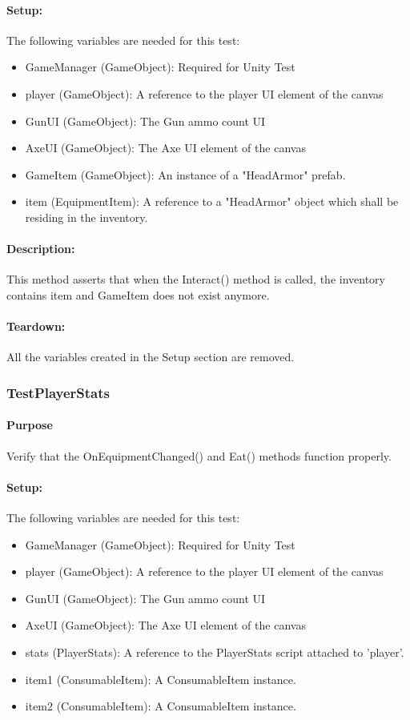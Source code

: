 \documentclass[12pt, titlepage]{article}
\begin{document}
{\paragraph{Setup: } The following variables are needed for this test:
\begin{itemize}
	\item GameManager (GameObject): Required for Unity Test
	\item  player (GameObject): A reference to the player UI element of the canvas
	\item  GunUI (GameObject): The Gun ammo count UI
	\item AxeUI (GameObject): The Axe UI element of the canvas
	\item GameItem (GameObject): An instance of a "HeadArmor" prefab.
	\item item (EquipmentItem): A reference to a "HeadArmor" object which shall be residing in the inventory.
	
\end{itemize}
\paragraph{Description: }
This method asserts that when the Interact() method is called, the inventory contains item and GameItem does not exist anymore.

\paragraph{Teardown: } All the variables created in the Setup section are removed.

\subsubsection{Test\textunderscore PlayerStats}

\paragraph{Purpose} Verify that the OnEquipmentChanged() and Eat() methods function properly.

\paragraph{Setup: } The following variables are needed for this test:
\begin{itemize}
	\item GameManager (GameObject): Required for Unity Test
	\item  player (GameObject): A reference to the player UI element of the canvas
	\item  GunUI (GameObject): The Gun ammo count UI
	\item AxeUI (GameObject): The Axe UI element of the canvas
	\item stats (PlayerStats): A reference to the PlayerStats script attached to 'player'.
	\item item1 (ConsumableItem): A ConsumableItem instance.
	\item item2 (ConsumableItem): A ConsumableItem instance.
	

\end{itemize}}
\end{document}
